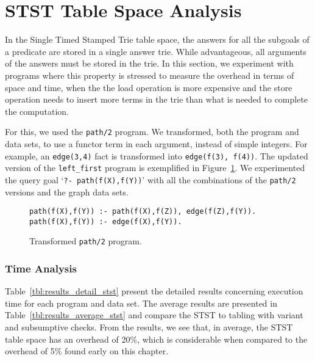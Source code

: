 



\section{STST Table Space Analysis}

In the Single Timed Stamped Trie table space, the answers for all the subgoals
of a predicate are stored in a single answer trie. While advantageous, all arguments of
the answers must be stored in the trie. In this section, we experiment with programs
where this property is stressed to measure the overhead in terms of space and time, when
the the load operation is more expensive and the store operation needs to insert more terms in
the trie than what is needed to complete the computation.

For this, we used the \texttt{path/2} program. We transformed, both the program and data sets,
to use a functor term in each argument, instead of simple integers. For example, an
\texttt{edge(3,4)} fact is transformed into \texttt{edge(f(3), f(4))}. The updated version
of the \texttt{left\_first} program is exemplified in Figure~\ref{fig:converted_path}.
We experimented the query goal `\texttt{?-~path(f(X),f(Y))}' with all the combinations of
the \texttt{path/2} versions and the graph data sets.

\begin{figure}[ht]
\begin{Verbatim}
path(f(X),f(Y)) :- path(f(X),f(Z)), edge(f(Z),f(Y)).
path(f(X),f(Y)) :- edge(f(X),f(Y)).
\end{Verbatim}
\caption{Transformed \texttt{path/2} program.}
\label{fig:converted_path}
\end{figure}

\subsubsection{Time Analysis}

Table~\ref{tbl:results_detail_stst} present the detailed results concerning execution time for each
program and data set.
The average results are presented in Table~\ref{tbl:results_average_stst} and compare the STST to
tabling with variant and subsumptive checks. From the results,
we see that, in average, the STST table space has an overhead of 20\%, which is considerable when
compared to the overhead of 5\% found early on this chapter.

